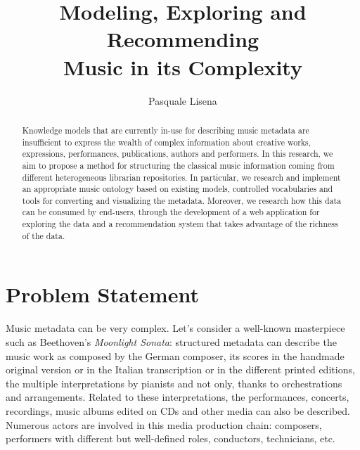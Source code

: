 \documentclass{llncs}
\begin{document}
\title{Modeling, Exploring and Recommending\\ Music in its Complexity}

\author{Pasquale Lisena}

\maketitle


\begin{abstract}
Knowledge models that are currently in-use for describing music metadata are insufficient to express the wealth of complex information about creative works, expressions, performances, publications, authors and performers. In this research, we aim to propose a method for structuring the classical music information coming from different heterogeneous librarian repositories. In particular, we research and implement an appropriate music ontology based on existing models, controlled vocabularies and tools for converting and visualizing the metadata. Moreover, we research how this data can be consumed by end-users, through the development of a web application for exploring the data and a recommendation system that takes advantage of the richness of the data.
\end{abstract}


\section{Problem Statement}
\label{sec:problem}
Music metadata can be very complex. Let's consider a well-known masterpiece such as Beethoven's \textit{Moonlight Sonata}: structured metadata can describe the music work as composed by the German composer, its scores in the handmade original version or in the Italian transcription or in the different printed editions, the multiple interpretations by pianists and not only, thanks to orchestrations and arrangements. Related to these interpretations, the performances, concerts, recordings, music albums edited on CDs and other media can also be described. Numerous actors are involved in this media production chain: composers, performers with different but well-defined roles, conductors, technicians, etc.
\end{document}
